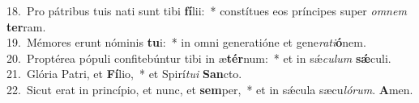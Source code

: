 {18.~}Pro pátribus tuis nati sunt tibi \textbf{fí}lii:~* constítues eos príncipes super \textit{om}\textit{nem} \textbf{ter}ram.\\
{19.~}Mémores erunt nóminis \textbf{tu}i:~* in omni generatióne et gene\textit{ra}\textit{ti}\textbf{ó}nem.\\
{20.~}Proptérea pópuli confitebúntur tibi in æ\textbf{tér}num:~* et in sǽ\textit{cu}\textit{lum} \textbf{sǽ}culi.\\
{21.~}Glória Patri, et \textbf{Fí}lio,~* et Spirí\textit{tu}\textit{i} \textbf{San}cto.\\
{22.~}Sicut erat in princípio, et nunc, et \textbf{sem}per,~* et in sǽcula sæcu\textit{ló}\textit{rum}. \textbf{A}men.\\
